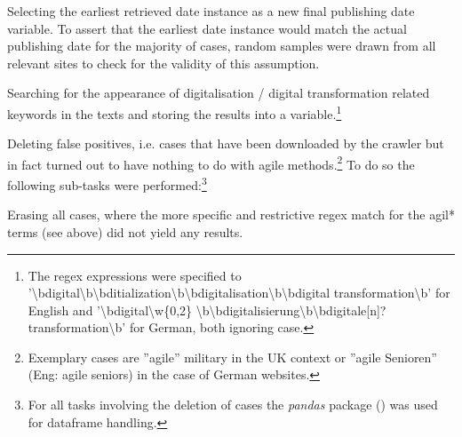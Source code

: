 \begin{compactitem}
\item Selecting the earliest retrieved date instance as a new final publishing date variable. To assert that the earliest date instance would match the actual publishing date for the majority of cases, random samples were drawn from all relevant sites to check for the validity of this assumption. 
\item Searching for the appearance of digitalisation / digital transformation related keywords in the texts and storing the results into a variable.\footnote{The regex expressions were specified to '\textbackslash bdigital\textbackslash b\textbar \textbackslash bditialization\textbackslash b\textbar \textbackslash bdigitalisation\textbackslash b\textbar \textbackslash bdigital transformation\textbackslash b' for English and '\textbackslash bdigital\textbackslash w\{0,2\} \textbackslash b\textbar \textbackslash bdigitalisierung\textbackslash b\textbar \textbackslash bdigitale[n]? transformation\textbackslash b' for German, both ignoring case.}
\item Deleting false positives, i.e. cases that have been downloaded by the crawler but in fact turned out to have nothing to do with agile methods.\footnote{Exemplary cases are ”agile” military in the UK context or ”agile Senioren” (Eng: agile seniors) in the case of German websites.} To do so the following sub-tasks were performed:\footnote{For all tasks involving the deletion of cases the \textit{pandas} package (\cite{McKinney2010}) was used for dataframe handling.}
    \begin{compactitem}
    \item Erasing all cases, where the more specific and restrictive regex match for the agil* terms (see above) did not yield any results. 

\end{compactitem}
\end{compactitem}
